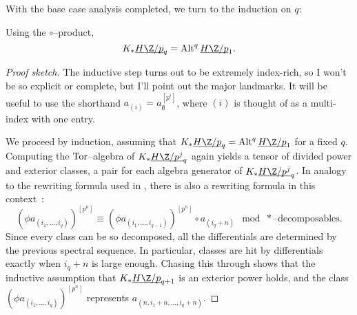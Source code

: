 With the base case analysis completed, we turn to the induction on $q$:
\begin{theorem}
Using the $\circ$--product, \[K_* \OS{H\Z/p}{q} = \Alt^q \OS{H\Z/p}{1}.\]
\end{theorem}
\begin{proof}[Proof sketch]
The inductive step turns out to be extremely index-rich, so I won't be so explicit or complete, but I'll point out the major landmarks.  It will be useful to use the shorthand $a_{(i)} = a_\emptyset^{[p^i]}$, where $(i)$ is thought of as a multi-index with one entry.

We proceed by induction, assuming that $K_* \OS{H\Z/p}{q} = \Alt^q \OS{H\Z/p}{1}$ for a fixed $q$.  Computing the $\operatorname{Tor}$--algebra of $K_* \OS{H\Z/p^j}{q}$ again yields a tensor of divided power and exterior classes, a pair for each algebra generator of $K_* \OS{H\Z/p^j}{q}$.  In analogy to the rewriting formula used in , there is also a rewriting formula in this context~\cite[Lemmas 9.5-6]{RavenelWilsonKthyOfEMSpaces}: \[(\phi a_{(i_1, \ldots, i_q)})^{[p^n]} \equiv (\phi a_{(i_1, \ldots, i_{q-1})})^{[p^n]} \circ a_{(i_q + n)} \mod *\text{--decomposables}.\]  Since every class can be so decomposed, all the differentials are determined by the previous spectral sequence.  In particular, classes are hit by differentials exactly when $i_q + n$ is large enough.  Chasing this through shows that the inductive assumption that $K_* \OS{H\Z/p}{q+1}$ is an exterior power holds, and the class $(\phi a_{(i_1, \ldots, i_q)})^{[p^n]}$ represents $a_{(n, i_1 + n, \ldots, i_q + n)}$.
\end{proof}

